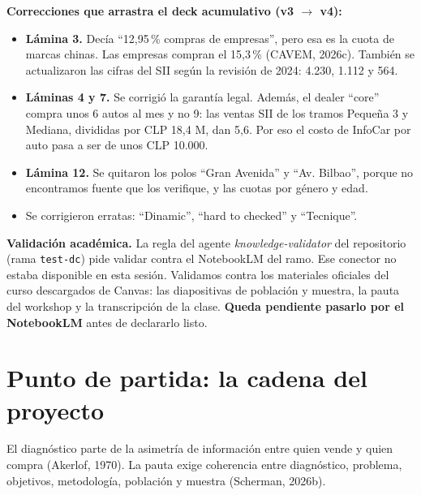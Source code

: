 \documentclass[11pt,a4paper]{article}
\begin{document}
\textbf{Correcciones que arrastra el deck acumulativo (v3 $\rightarrow$ v4):}
\begin{itemize}
\item \textbf{Lámina 3.} Decía \enquote{12,95\,\% compras de empresas}, pero esa es la cuota de marcas chinas. Las empresas compran el 15,3\,\% (CAVEM, 2026c). También se actualizaron las cifras del SII según la revisión de 2024: 4.230, 1.112 y 564.
\item \textbf{Láminas 4 y 7.} Se corrigió la garantía legal. Además, el dealer \enquote{core} compra unos 6 autos al mes y no 9: las ventas SII de los tramos Pequeña 3 y Mediana, divididas por CLP 18,4 M, dan 5,6. Por eso el costo de InfoCar por auto pasa a ser de unos CLP 10.000.
\item \textbf{Lámina 12.} Se quitaron los polos \enquote{Gran Avenida} y \enquote{Av. Bilbao}, porque no encontramos fuente que los verifique, y las cuotas por género y edad.
\item Se corrigieron erratas: \enquote{Dinamic}, \enquote{hard to checked} y \enquote{Tecnique}.
\end{itemize}

\textbf{Validación académica.} La regla del agente \emph{knowledge-validator} del repositorio (rama \texttt{test-dc}) pide validar contra el NotebookLM del ramo. Ese conector no estaba disponible en esta sesión. Validamos contra los materiales oficiales del curso descargados de Canvas: las diapositivas de población y muestra, la pauta del workshop y la transcripción de la clase. \textbf{Queda pendiente pasarlo por el NotebookLM} antes de declararlo listo.

\section{Punto de partida: la cadena del proyecto}
El diagnóstico parte de la asimetría de información entre quien vende y quien compra (Akerlof, 1970). La pauta exige coherencia entre diagnóstico, problema, objetivos, metodología, población y muestra (Scherman, 2026b).
\end{document}
